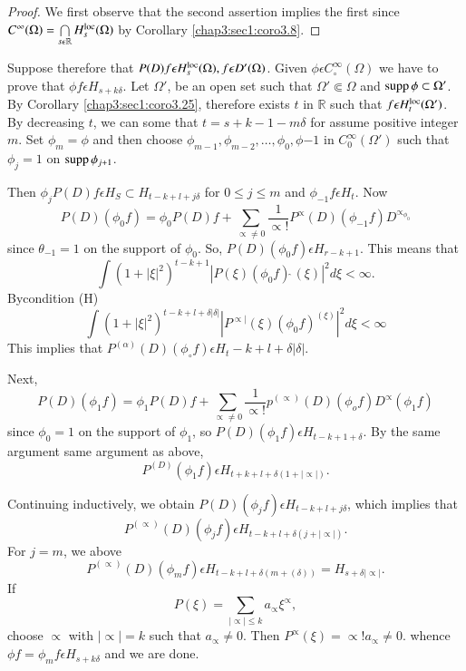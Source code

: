 \begin{proof}
We first observe that the second assertion implies the first since
$C^\infty (\Omega)= \bigcap\limits_{s \epsilon \mathbb{R}}
H^{\operatorname{loc}}_{s}(\Omega)$ by Corollary \ref{chap3:sec1:coro3.8}.  
\end{proof}

Suppose therefore that $P(D) f \epsilon H^{\operatorname{loc}}_s(\Omega), f
\epsilon D' (\Omega)$. Given $\phi \epsilon
C^\infty_\circ(\Omega)$ we have to prove that $\phi f \epsilon
H_{s+k\delta}$. Let $\Omega'$, be an open set such that $\Omega' \Subset
\Omega$ and $\operatorname{supp} \phi \subset \Omega'$. By
Corollary \ref{chap3:sec1:coro3.25}, therefore
exists $t$ in $\mathbb{R}$ such that $f \epsilon H^{\operatorname{loc}}_t(\Omega
')$. By decreasing $t$, we can some that $t = s+ k -1-m\delta$ for
assume positive integer $m$. Set $\phi_m = \phi $ and then choose
$\phi _{m-1},\phi _{m-2},\ldots, \phi_0, \phi{-1}$ in
$C^\infty_0(\Omega')$ such that $\phi_j = 1$ on $\operatorname{supp} \phi_{j+1}$.  
	
Then $\phi_j P(D) f \epsilon H_S \subset H_{t-k+l+j\delta}$ for $0
\leq j \leq m$ and $\phi_{-1}f \epsilon H_t$. Now  
$$
P(D) (\phi_0 f ) = \phi _0 P(D) f + \sum_{\propto \neq
  0}\frac{1}{\propto!} P^{\propto}(D) (\phi_{-1}f)D^{\propto_{\phi_0}} 
$$
since $\theta_{-1}=1$ on the support of $\phi _0$. So, $P(D) (\phi_0
f) \epsilon H_{r-k+1}$. This means that  
$$
\int (1+ |\xi|^2)^{t-k+1}|P(\xi)(\phi_0 f)\hat{~}(\xi)|^2 d\xi < \infty. 
$$ 
By\pageoriginale condition (H)
$$
\int (1 +|\xi|^2)^{t-k+l+\delta|\delta|} |P^{\propto|} (\xi)(\phi_0f)^(\xi)
|^2 d \xi < \infty  
$$
This implies that 
$P^{(\alpha)}(D) (\phi_\circ f)\epsilon H_t-k + l + \delta |\delta|$.

Next, 
$$
P(D)(\phi_1 f) = \phi_1 P(D) f + \sum_{\propto\neq 0}
\frac{1}{\propto !} p^{(\propto)}(D)(\phi_o f) D^{\propto}(\phi_1 f) 
$$
since $\phi_0 = 1$ on the support of $\phi_1$, so $P(D) (\phi_1 f)
\epsilon H_{t - k +1+\delta}$. By the same argument same argument
as above,  
$$
P^{(D)}(\phi_1 f) \epsilon H_{t + k+l+\delta (1+|\propto|)}. 
$$

Continuing inductively, we obtain $P(D) (\phi_j f)\epsilon
H_{t-k+l+j\delta}$, which implies that  
$$
P^{(\propto)} (D) (\phi_j f )\epsilon H_{t- k+l + \delta (j+|\propto|)}. 
$$
For $j = m$, we above 
$$
P^{(\propto)}(D)(\phi_m f) \epsilon H_{t- k+l+\delta (m + (\delta))}
= H_{s + \delta |\propto|}.  
$$
If 
$$
P(\xi) = \sum_{|\propto|\leq k} a_\propto \xi^{\propto}, 
$$
choose $\propto$ with $|\propto|= k$ such that $a_\propto \neq
0$. Then $P^{\propto}(\xi)= \propto ! a_{\propto}\neq 0$. whence $\phi
f= \phi_m f \epsilon H_{s+k\delta}$ and we are done.  

